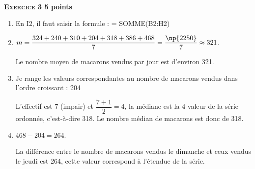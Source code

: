 \textbf{\textsc{Exercice 3} \hfill 5 points}

\medskip

\begin{enumerate}
\item En I2, il faut saisir la formule : = SOMME(B2:H2)
\item  $m =  \dfrac{324+240+310+204+318+386+468}{7} = \dfrac{\np{2250}}{7} \approx 321$.

Le nombre moyen de macarons vendus par jour est d'environ 321.
\item  Je range les valeurs correspondantes au nombre de macarons vendus dans l'ordre
croissant : 204 

L'effectif est 7 (impair) et $\dfrac{7 + 1}{2} = 4$, la médiane est la 4 valeur de la série ordonnée, c'est-à-dire 318.  Le nombre médian de macarons est donc de 318.
\item  $468 - 204 = 264$.

La différence entre le nombre de macarons vendus le dimanche et ceux vendus le jeudi
est 264, cette valeur correspond à l'étendue de la série.
\end{enumerate}

\vspace{0,5cm}

